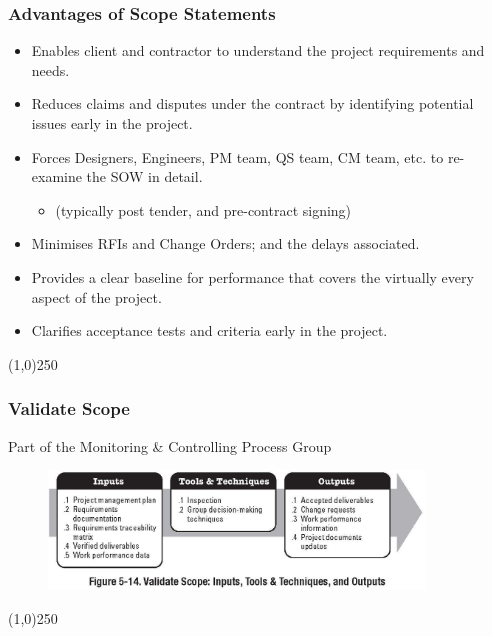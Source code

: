 \begin{frame}
\frametitle{Advantages of Scope Statements}
\begin{itemize}
	\item Enables client and contractor to understand the project requirements and needs.
	\item Reduces claims and disputes under the contract by identifying potential issues early in the project.
	\item Forces Designers, Engineers, PM team, QS team, CM team, etc. to re-examine the SOW in detail. 
		\begin{itemize}
			\item (typically post tender, and pre-contract signing)
		\end{itemize}
	\item Minimises RFIs and Change Orders; and the delays associated.
	\item Provides a clear baseline for performance that covers the virtually every aspect of the project.
	\item Clarifies acceptance tests and criteria early in the project.
\end{itemize}
\end{frame}\begin{center}\line(1,0){250}\end{center}



\begin{frame}
\frametitle{Validate Scope}{Part of the Monitoring \& Controlling Process Group}
\begin{figure}
	\centering
		\includegraphics[width = 10cm]{images/Fig5-14.jpg}
	\label{fig:Fig5-14}
\end{figure}
\end{frame}\begin{center}\line(1,0){250}\end{center}



